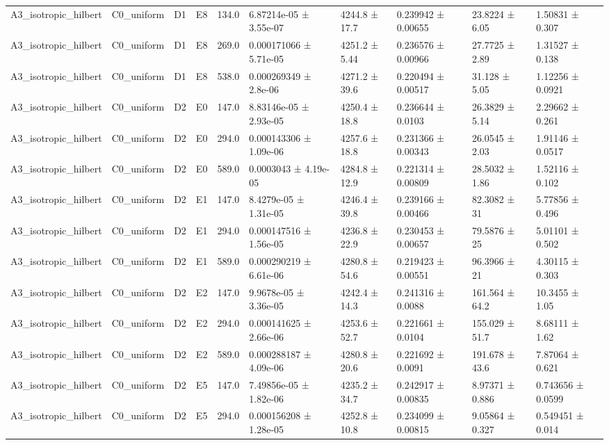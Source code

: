 \begin{table}
\begin{tabular}{llllllllll}
A3\_isotropic\_hilbert & C0\_uniform & D1 & E8 & 134.0 & 6.87214e-05 ± 3.55e-07 & 4244.8 ± 17.7 & 0.239942 ± 0.00655 & 23.8224 ± 6.05 & 1.50831 ± 0.307 \\
A3\_isotropic\_hilbert & C0\_uniform & D1 & E8 & 269.0 & 0.000171066 ± 5.71e-05 & 4251.2 ± 5.44 & 0.236576 ± 0.00966 & 27.7725 ± 2.89 & 1.31527 ± 0.138 \\
A3\_isotropic\_hilbert & C0\_uniform & D1 & E8 & 538.0 & 0.000269349 ± 2.8e-06 & 4271.2 ± 39.6 & 0.220494 ± 0.00517 & 31.128 ± 5.05 & 1.12256 ± 0.0921 \\
A3\_isotropic\_hilbert & C0\_uniform & D2 & E0 & 147.0 & 8.83146e-05 ± 2.93e-05 & 4250.4 ± 18.8 & 0.236644 ± 0.0103 & 26.3829 ± 5.14 & 2.29662 ± 0.261 \\
A3\_isotropic\_hilbert & C0\_uniform & D2 & E0 & 294.0 & 0.000143306 ± 1.09e-06 & 4257.6 ± 18.8 & 0.231366 ± 0.00343 & 26.0545 ± 2.03 & 1.91146 ± 0.0517 \\
A3\_isotropic\_hilbert & C0\_uniform & D2 & E0 & 589.0 & 0.0003043 ± 4.19e-05 & 4284.8 ± 12.9 & 0.221314 ± 0.00809 & 28.5032 ± 1.86 & 1.52116 ± 0.102 \\
A3\_isotropic\_hilbert & C0\_uniform & D2 & E1 & 147.0 & 8.4279e-05 ± 1.31e-05 & 4246.4 ± 39.8 & 0.239166 ± 0.00466 & 82.3082 ± 31 & 5.77856 ± 0.496 \\
A3\_isotropic\_hilbert & C0\_uniform & D2 & E1 & 294.0 & 0.000147516 ± 1.56e-05 & 4236.8 ± 22.9 & 0.230453 ± 0.00657 & 79.5876 ± 25 & 5.01101 ± 0.502 \\
A3\_isotropic\_hilbert & C0\_uniform & D2 & E1 & 589.0 & 0.000290219 ± 6.61e-06 & 4280.8 ± 54.6 & 0.219423 ± 0.00551 & 96.3966 ± 21 & 4.30115 ± 0.303 \\
A3\_isotropic\_hilbert & C0\_uniform & D2 & E2 & 147.0 & 9.9678e-05 ± 3.36e-05 & 4242.4 ± 14.3 & 0.241316 ± 0.0088 & 161.564 ± 64.2 & 10.3455 ± 1.05 \\
A3\_isotropic\_hilbert & C0\_uniform & D2 & E2 & 294.0 & 0.000141625 ± 2.66e-06 & 4253.6 ± 52.7 & 0.221661 ± 0.0104 & 155.029 ± 51.7 & 8.68111 ± 1.62 \\
A3\_isotropic\_hilbert & C0\_uniform & D2 & E2 & 589.0 & 0.000288187 ± 4.09e-06 & 4280.8 ± 20.6 & 0.221692 ± 0.0091 & 191.678 ± 43.6 & 7.87064 ± 0.621 \\
A3\_isotropic\_hilbert & C0\_uniform & D2 & E5 & 147.0 & 7.49856e-05 ± 1.82e-06 & 4235.2 ± 34.7 & 0.242917 ± 0.00835 & 8.97371 ± 0.886 & 0.743656 ± 0.0599 \\
A3\_isotropic\_hilbert & C0\_uniform & D2 & E5 & 294.0 & 0.000156208 ± 1.28e-05 & 4252.8 ± 10.8 & 0.234099 ± 0.00815 & 9.05864 ± 0.327 & 0.549451 ± 0.014 \\

\end{tabular}
\end{table}
